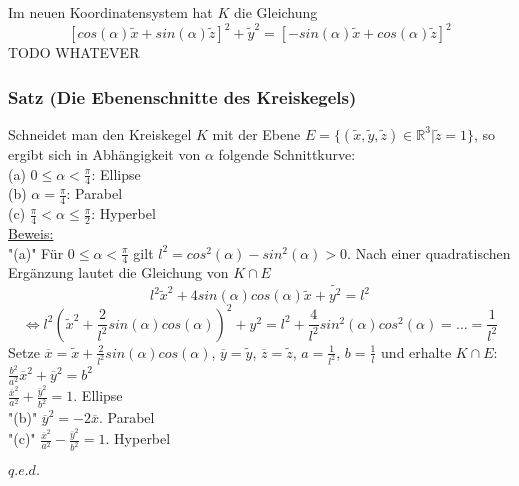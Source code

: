 \documentclass[a4paper]{article}
\newcommand{\ul}{\underline}
\renewcommand{\proof}{\ul{Beweis:}\\}
\renewcommand{\qed}{\begin{flushright}
\ul{\(q.e.d.\)}
\end{flushright}}
\begin{document}
Im neuen Koordinatensystem hat \(K\) die Gleichung
$$\left[cos(\alpha)\tilde{x}+sin(\alpha)\tilde{z}\right]^2+\tilde{y}^2=\left[-sin(\alpha)\tilde{x}+cos(\alpha)\tilde{z}\right]^2$$
TODO WHATEVER
\subsubsection{Satz (Die Ebenenschnitte des Kreiskegels)}
Schneidet man den Kreiskegel \(K\) mit der Ebene \(E=\{(\tilde{x},\tilde{y},\tilde{z})\in\mathbb{R}^3|\tilde{z}=1\}\), so ergibt sich in Abhängigkeit von \(\alpha\) folgende Schnittkurve:\\
(a) \(0\leq \alpha < \frac{\pi}{4}\): Ellipse\\
(b) \(\alpha=\frac{\pi}{4}\): Parabel\\
(c) \(\frac{\pi}{4}<\alpha\leq \frac{\pi}{2}\): Hyperbel\\
\proof
"(a)" Für \(0\leq\alpha <\frac{\pi}{4}\) gilt \(l^2=cos^2(\alpha)-sin^2(\alpha)>0\). Nach einer quadratischen Ergänzung lautet die Gleichung von \(K\cap E\)
$$l^2\tilde{x}^2+4sin(\alpha)cos(\alpha)\tilde{x}+\tilde{y^2}=l^2$$
$$\Leftrightarrow l^2(\tilde{x}^2+\frac{2}{l^2}sin(\alpha)cos(\alpha))^2+y^2=l^2+\frac{4}{l^2}sin^2(\alpha)cos^2(\alpha)=\dots=\frac{1}{l^2}$$
Setze \(\overline{x}=\tilde{x}+\frac{2}{l^2}sin(\alpha)cos(\alpha)\), \(\overline{y}=\tilde{y}\), \(\overline{z}=\tilde{z}\), \(a=\frac{1}{l^2}\), \(b=\frac{1}{l}\) und erhalte \(K\cap E\):\\ \(\frac{b^2}{a^2}\overline{x}^2+\overline{y}^2=b^2\)\\
\(\frac{\overline{x}^2}{a^2}+\frac{\overline{y}^2}{b^2}=1\). Ellipse\\
"(b)" \(\overline{y}^2=-2\overline{x}\). Parabel\\
"(c)" \(\frac{\overline{x}^2}{a^2}-\frac{\overline{y}^2}{b^2}=1\). Hyperbel
\qed
\end{document}
